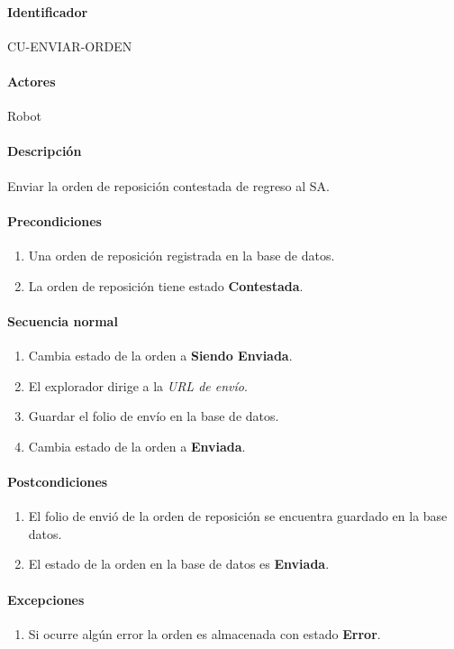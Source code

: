 \paragraph*{Identificador}
CU-ENVIAR-ORDEN
\paragraph*{Actores}
Robot
\paragraph*{Descripción}
Enviar la orden de reposición contestada de regreso al SA.
\paragraph*{Precondiciones}
\begin{enumerate}
  \item Una orden de reposición registrada en la base de datos.
  \item La orden de reposición tiene estado \textbf{Contestada}.
\end{enumerate}
\paragraph*{Secuencia normal}
\begin{enumerate}
  \item Cambia estado de la orden a \textbf{Siendo Enviada}.
  \item El explorador dirige a la \textit{URL de envío}.
  \item Guardar el folio de envío en la base de datos.
  \item Cambia estado de la orden a \textbf{Enviada}.
\end{enumerate}
\paragraph*{Postcondiciones}
\begin{enumerate}
  \item El folio de envió de la orden de reposición se encuentra guardado en la base datos.
  \item El estado de la orden en la base de datos es \textbf{Enviada}.
\end{enumerate}
\paragraph*{Excepciones}
\begin{enumerate}
  \item Si ocurre algún error la orden es almacenada con estado \textbf{Error}.
\end{enumerate}


